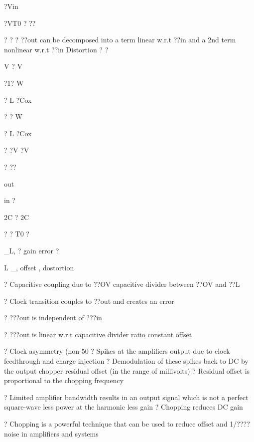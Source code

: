 \documentclass[2pt,landscape]{article}
\begin{document}
\begin{multicols*}{5}
?Vin


?VT0 ?	??


?	?
?	??out can be decomposed into a term linear w.r.t ??in and a 2nd term 
nonlinear w.r.t ??in
Distortion	?	?


V	? V


?1? W


? L ?Cox


? ? W


? L ?Cox


? ?V ?V


?	??


out


in ?




2C	?	2C


? ?	T0	?


\textbullet \_L\textbullet ,
?	gain error ?


\textbullet \textbullet L \textbullet \textbullet \textbullet \_\textbullet \textbullet \textbullet \textbullet \textbullet ,
offset , dostortion



?	Capacitive coupling due to ??OV
capacitive divider between
??OV and ??L

?	Clock transition couples
to ??out and creates an error

?	???out is independent of ???in



?	???out is linear w.r.t capacitive divider ratio
constant offset




?	Clock asymmetry (non-50%
?	Spikes at the amplifier\textbullet s output due to clock feedthrough and charge 
injection
?	Demodulation of these spikes back to DC by the output chopper 
residual offset (in the range of millivolts)
?	Residual offset is proportional to the chopping frequency







?	Limited amplifier bandwidth results in an output signal which is not a 
perfect square-wave
less power at the harmonic	less gain
?	Chopping reduces DC gain









?	Chopping is a powerful technique that can be used to reduce offset 
and 1/???? noise in amplifiers and systems



\end{multicols*}
\end{document}

